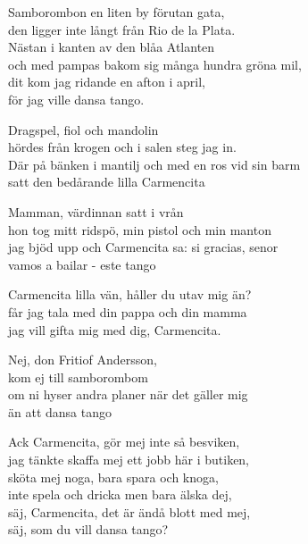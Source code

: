 \vspace{10pt}
Samborombon en liten by förutan gata,\\
den ligger inte långt från Rio de la Plata.\\
Nästan i kanten av den blåa Atlanten\\
och med pampas bakom sig många hundra gröna mil,\\
dit kom jag ridande en afton i april,\\
för jag ville dansa tango.\par
\vspace{10pt}
Dragspel, fiol och mandolin\\
hördes från krogen och i salen steg jag in.\\
Där på bänken i mantilj och med en ros vid sin barm\\
satt den bedårande lilla Carmencita\par
\vspace{10pt}
Mamman, värdinnan satt i vrån\\
hon tog mitt ridspö, min pistol och min manton\\
jag bjöd upp och Carmencita sa: si gracias, senor\\
vamos a bailar - este tango\par
\vspace{10pt}
Carmencita lilla vän, håller du utav mig än?\\
får jag tala med din pappa och din mamma\\
jag vill gifta mig med dig, Carmencita.\par
\vspace{10pt}
Nej, don Fritiof Andersson,\\
kom ej till samborombom\\
om ni hyser andra planer när det gäller mig\\
än att dansa tango\par
\vspace{10pt}
Ack Carmencita, gör mej inte så besviken,\\
jag tänkte skaffa mej ett jobb här i butiken,\\
sköta mej noga, bara spara och knoga,\\
inte spela och dricka men bara älska dej,\\
säj, Carmencita, det är ändå blott med mej,\\
säj, som du vill dansa tango?\par
\vspace{10pt}
